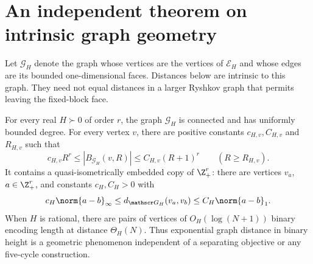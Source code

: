 \section{An independent theorem on intrinsic graph geometry}\label{sec:graph}
Let $\mathscr G_H$ denote the graph whose vertices are the vertices of $\mathcal E_H$ and whose edges are its bounded one-dimensional faces. Distances below are intrinsic to this graph. They need not equal distances in a larger Ryshkov graph that permits leaving the fixed-block face.

\begin{theorem}\label{thm:graph}
For every real $H\succ0$ of order $r$, the graph $\mathscr G_H$ is connected and has uniformly bounded degree. For every vertex $v$, there are positive constants $c_{H,v},C_{H,v}$ and $R_{H,v}$ such that
\[
 c_{H,v}R^r\le |B_{\mathscr G_H}(v,R)|\le C_{H,v}(R+1)^r
 \qquad(R\ge R_{H,v}).
\]
It contains a quasi-isometrically embedded copy of $\Z_+^r$: there are vertices $v_a$, $a\in\Z_+^r$, and constants $c_H,C_H>0$ with
\[
 c_H\norm{a-b}_\infty\le d_{\mathscr G_H}(v_a,v_b)
 \le C_H\norm{a-b}_1.
\]
When $H$ is rational, there are pairs of vertices of $O_H(\log(N+1))$ binary encoding length at distance $\Theta_H(N)$. Thus exponential graph distance in binary height is a geometric phenomenon independent of a separating objective or any five-cycle construction.
\end{theorem}
